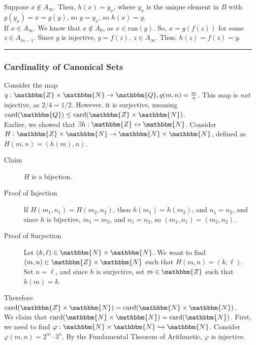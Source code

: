 \documentclass[10pt]{extarticle}
\begin{document}
\begin{description}
\begin{description}
              Suppose $x\notin A_{\infty}$. Then, $h(x) = y_x$, where $y_x$ is the unique element in $B$ with $g(y_x)=x=g(y)$, so $y = y_x$, so $h(x) = y$.\\

              If $x\in A_{\infty}$. We know that $x\notin A_0$, as $x\in \text{ran}(g)$. So, $x = g(f(z))$ for some $z\in A_{m-1}$. Since $g$ is injective, $y = f(z),~z\in A_{\infty}$. Thus, $h(z) = f(z) = y$.
          \end{description}
      \end{description}
      \vspace{4pt}
      \rule{\textwidth}{0.4pt}
      \subsubsection{Cardinality of Canonical Sets}%
      Consider the map $q: \mathbbm{Z} \times \mathbbm{N} \rightarrow \mathbbm{Q}, q(m,n) = \frac{m}{n}$. This map is \textsl{not} injective, as $2/4 = 1/2$. However, it is surjective, meaning $\text{card}(\mathbbm{Q}) \leq \text{card}(\mathbbm{Z} \times \mathbbm{N})$.\\

      Earlier, we showed that $\exists h: \mathbbm{Z} \leftrightarrow \mathbbm{N}$. Consider $H: \mathbbm{Z} \times \mathbbm{N} \rightarrow \mathbbm{N} \times\mathbbm{N}$, defined as $H(m,n) = (h(m),n)$. 
      \begin{description}
        \item[Claim] $H$ is a bijection.
        \item[Proof of Injection] If $H(m_1,n_1) = H(m_2,n_2)$, then $h(m_1) = h(m_2)$, and $n_1 = n_2$, and since $h$ is bijective, $m_1 = m_2$, and $n_1 = n_2$, so $(m_1,n_1) = (m_2,n_2)$.
        \item[Proof of Surjection] Let $(k,\ell)\in \mathbbm{N} \times \mathbbm{N}$. We want to find $(m,n)\in \mathbbm{Z}\times \mathbbm{N}$ such that $H(m,n) = (k,\ell)$. Set $n = \ell$, and since $h$ is surjective, set $m\in \mathbbm{Z}$ such that $h(m) = k$.
      \end{description}
      Therefore $\text{card}(\mathbbm{Z} \times \mathbbm{N}) = \text{card}(\mathbbm{N}\times \mathbbm{N})$.\\

      We claim that $\text{card}(\mathbbm{N} \times \mathbbm{N}) = \text{card}(\mathbbm{N})$. First, we need to find $\varphi: \mathbbm{N}\times \mathbbm{N} \xhookrightarrow{} \mathbbm{N}$. Consider $\varphi(m,n) = 2^m\cdot 3^n$. By the Fundamental Theorem of Arithmetic, $\varphi$ is injective.\\
\end{document}
